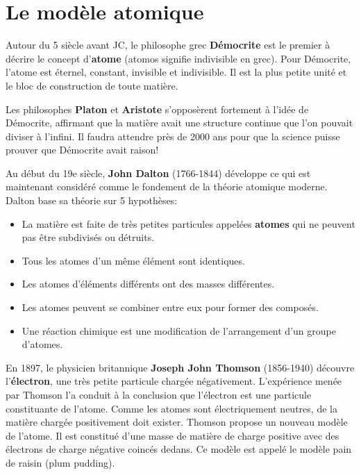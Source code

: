\documentclass[
  11pt,
  a4paper,
  openany]{book}
\providecommand{\tightlist}{%
  \setlength{\itemsep}{0pt}\setlength{\parskip}{0pt}}
\begin{document}
\hypertarget{le-moduxe8le-atomique}{%
\section{Le modèle atomique}\label{le-moduxe8le-atomique}}

Autour du 5 siècle avant JC, le philosophe grec \textbf{Démocrite} est le premier à décrire le concept d'\textbf{atome} (atomos signifie indivisible en grec). Pour Démocrite, l'atome est éternel, constant, invisible et indivisible. Il est la plus petite unité et le bloc de construction de toute matière.

Les philosophes \textbf{Platon} et \textbf{Aristote} s'opposèrent fortement à l'idée de Démocrite, affirmant que la matière avait une structure continue que l'on pouvait diviser à l'infini. Il faudra attendre près de 2000 ans pour que la science puisse prouver que Démocrite avait raison!

Au début du 19e siècle, \textbf{John Dalton} (1766-1844) développe ce qui est maintenant considéré comme le fondement de la théorie atomique moderne. Dalton base sa théorie sur 5 hypothèses:

\begin{itemize}
\tightlist
\item
  La matière est faite de très petites particules appelées \textbf{atomes} qui ne peuvent pas être subdivisés ou détruits.
\item
  Tous les atomes d'un même élément sont identiques.
\item
  Les atomes d'éléments différents ont des masses différentes.
\item
  Les atomes peuvent se combiner entre eux pour former des composés.
\item
  Une réaction chimique est une modification de l'arrangement d'un groupe d'atomes.
\end{itemize}

En 1897, le physicien britannique \textbf{Joseph John Thomson} (1856-1940) découvre l'\textbf{électron}, une très petite particule chargée négativement. L'expérience menée par Thomson l'a conduit à la conclusion que l'électron est une particule constituante de l'atome. Comme les atomes sont électriquement neutres, de la matière chargée positivement doit exister. Thomson propose un nouveau modèle de l'atome. Il est constitué d'une masse de matière de charge positive avec des électrons de charge négative coincés dedans. Ce modèle est appelé le modèle pain de raisin (plum pudding).
\end{document}

